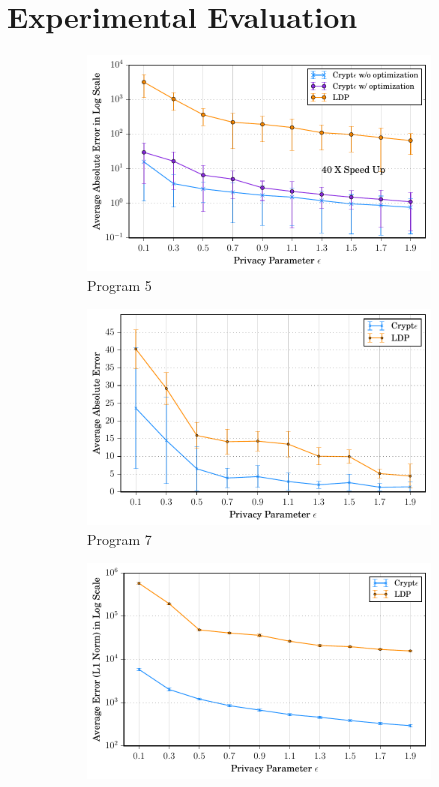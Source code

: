 \section{Experimental Evaluation}
\begin{figure}
    \begin{subfigure}[b]{0.25\linewidth}
    \centering \includegraphics[width=1\linewidth]{t5_final.pdf}
        \caption{Program 5}
        \label{fig:mouse}\end{subfigure}%
    \begin{subfigure}[b]{0.25\linewidth}
    \centering    \includegraphics[width=1\linewidth]{t7_final.pdf}
        \caption{ Program 7}
        \label{fig:P5}\end{subfigure}%
      \begin{subfigure}[b]{0.25\linewidth}
    \centering    \includegraphics[width=1\linewidth]{t3_final.pdf}

\end{subfigure}
\end{figure}
